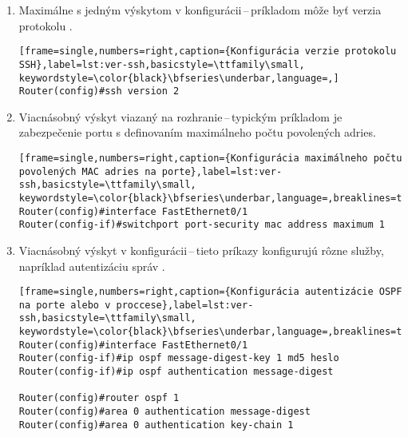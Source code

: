 \begin{enumerate}
	\item Maximálne s jedným výskytom v konfigurácii\,--\,príkladom môže byť verzia protokolu .
	
\begin{minipage}{\linewidth}		
\begin{lstlisting}[frame=single,numbers=right,caption={Konfigurácia verzie protokolu SSH},label=lst:ver-ssh,basicstyle=\ttfamily\small, keywordstyle=\color{black}\bfseries\underbar,language=,]
Router(config)#ssh version 2
\end{lstlisting}
\end{minipage}
	
	\item \vspace{2em} Viacnásobný výskyt viazaný na rozhranie\,--\,typickým príkladom je zabezpečenie portu s definovaním maximálneho počtu povolených  adries.
	
\begin{minipage}{\linewidth}		
\begin{lstlisting}[frame=single,numbers=right,caption={Konfigurácia maximálneho počtu povolených MAC adries na porte},label=lst:ver-ssh,basicstyle=\ttfamily\small, keywordstyle=\color{black}\bfseries\underbar,language=,breaklines=true]
Router(config)#interface FastEthernet0/1
Router(config-if)#switchport port-security mac address maximum 1
\end{lstlisting}
\end{minipage}

	\item \vspace{2em} Viacnásobný výskyt v konfigurácii\,--\,tieto príkazy konfigurujú rôzne služby, napríklad autentizáciu správ .

\begin{minipage}{\linewidth}		
\begin{lstlisting}[frame=single,numbers=right,caption={Konfigurácia autentizácie OSPF na porte alebo v proccese},label=lst:ver-ssh,basicstyle=\ttfamily\small, keywordstyle=\color{black}\bfseries\underbar,language=,breaklines=true]
Router(config)#interface FastEthernet0/1
Router(config-if)#ip ospf message-digest-key 1 md5 heslo
Router(config-if)#ip ospf authentication message-digest

Router(config)#router ospf 1
Router(config)#area 0 authentication message-digest
Router(config)#area 0 authentication key-chain 1
\end{lstlisting}
\end{minipage}
	

\end{enumerate}
